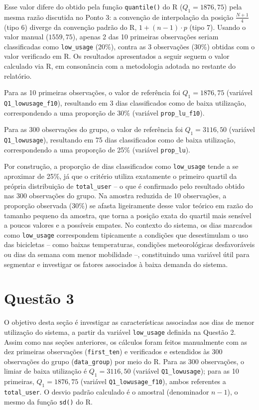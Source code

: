 \documentclass[10pt, a4paper]{article}
\begin{document}
Esse valor difere do obtido pela função \texttt{quantile()} do R ($Q_1 = 1876{,}75$) pela mesma razão discutida no Ponto 3: a convenção de interpolação da posição $\frac{N+1}{4}$ (tipo 6) diverge da convenção padrão do R, $1+(n-1)\cdot p$ (tipo 7). Usando o valor manual ($1559{,}75$), apenas 2 das 10 primeiras observações seriam classificadas como \texttt{low\_usage} (20\%), contra as 3 observações (30\%) obtidas com o valor verificado em R. Os resultados apresentados a seguir seguem o valor calculado via R, em consonância com a metodologia adotada no restante do relatório.

Para as 10 primeiras observações, o valor de referência foi $Q_1 = 1876{,}75$ (variável \texttt{Q1\_lowusage\_f10}), resultando em 3 dias classificados como de baixa utilização, correspondendo a uma proporção de 30\% (variável \texttt{prop\_lu\_f10}).

Para as 300 observações do grupo, o valor de referência foi $Q_1 = 3116{,}50$ (variável \texttt{Q1\_lowusage}), resultando em 75 dias classificados como de baixa utilização, correspondendo a uma proporção de 25\% (variável \texttt{prop\_lu}).

Por construção, a proporção de dias classificados como \texttt{low\_usage} tende a se aproximar de 25\%, já que o critério utiliza exatamente o primeiro quartil da própria distribuição de \texttt{total\_user} -- o que é confirmado pelo resultado obtido nas 300 observações do grupo. Na amostra reduzida de 10 observações, a proporção observada (30\%) se afasta ligeiramente desse valor teórico em razão do tamanho pequeno da amostra, que torna a posição exata do quartil mais sensível a poucos valores e a possíveis empates. No contexto do sistema, os dias marcados como \texttt{low\_usage} correspondem tipicamente a condições que desestimulam o uso das bicicletas -- como baixas temperaturas, condições meteorológicas desfavoráveis ou dias da semana com menor mobilidade --, constituindo uma variável útil para segmentar e investigar os fatores associados à baixa demanda do sistema.

\clearpage
\section{Questão 3}

O objetivo desta seção é investigar as características associadas aos dias de menor utilização do sistema, a partir da variável \texttt{low\_usage} definida na Questão 2. Assim como nas seções anteriores, os cálculos foram feitos manualmente com as dez primeiras observações (\texttt{first\_ten}) e verificados e estendidos às 300 observações do grupo (\texttt{data\_group}) por meio do R. Para as 300 observações, o limiar de baixa utilização é $Q_1 = 3116{,}50$ (variável \texttt{Q1\_lowusage}); para as 10 primeiras, $Q_1 = 1876{,}75$ (variável \texttt{Q1\_lowusage\_f10}), ambos referentes a \texttt{total\_user}. O desvio padrão calculado é o amostral (denominador $n-1$), o mesmo da função \texttt{sd()} do R.
\end{document}
